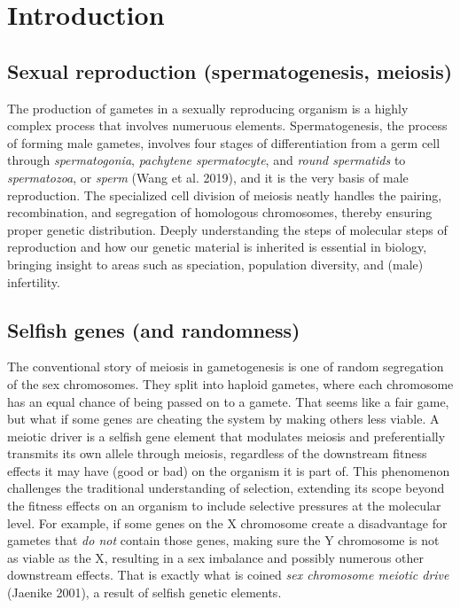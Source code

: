 \documentclass[
  a4paper,
]{scrbook}
\let\oldemph\emph
\renewcommand\emph[1]{\oldemph{\color{gray}#1}}
\renewcommand*\contentsname{Table of contents}
\newcommand\contentsname{Table of contents}
\begin{document}
\renewcommand*\contentsname{Table of contents}
{
\setcounter{tocdepth}{1}
\tableofcontents
}

\mainmatter
\newpage{}

\chapter{Introduction}\label{introduction}

\section{Sexual reproduction (spermatogenesis,
meiosis)}\label{sexual-reproduction-spermatogenesis-meiosis}

The production of gametes in a sexually reproducing organism is a highly
complex process that involves numeruous elements. Spermatogenesis, the
process of forming male gametes, involves four stages of differentiation
from a germ cell through \emph{spermatogonia}, \emph{pachytene
spermatocyte}, and \emph{round spermatids} to \emph{spermatozoa}, or
\emph{sperm} (Wang et al. 2019), and it is the very basis of male
reproduction. The specialized cell division of meiosis neatly handles
the pairing, recombination, and segregation of homologous chromosomes,
thereby ensuring proper genetic distribution. Deeply understanding the
steps of molecular steps of reproduction and how our genetic material is
inherited is essential in biology, bringing insight to areas such as
speciation, population diversity, and (male) infertility.

\section{Selfish genes (and
randomness)}\label{selfish-genes-and-randomness}

The conventional story of meiosis in gametogenesis is one of random
segregation of the sex chromosomes. They split into haploid gametes,
where each chromosome has an equal chance of being passed on to a
gamete. That seems like a fair game, but what if some genes are cheating
the system by making others less viable. A meiotic driver is a selfish
gene element that modulates meiosis and preferentially transmits its own
allele through meiosis, regardless of the downstream fitness effects it
may have (good or bad) on the organism it is part of. This phenomenon
challenges the traditional understanding of selection, extending its
scope beyond the fitness effects on an organism to include selective
pressures at the molecular level. For example, if some genes on the X
chromosome create a disadvantage for gametes that \emph{do not} contain
those genes, making sure the Y chromosome is not as viable as the X,
resulting in a sex imbalance and possibly numerous other downstream
effects. That is exactly what is coined \emph{sex chromosome meiotic
drive} (Jaenike 2001), a result of selfish genetic elements.
\end{document}

